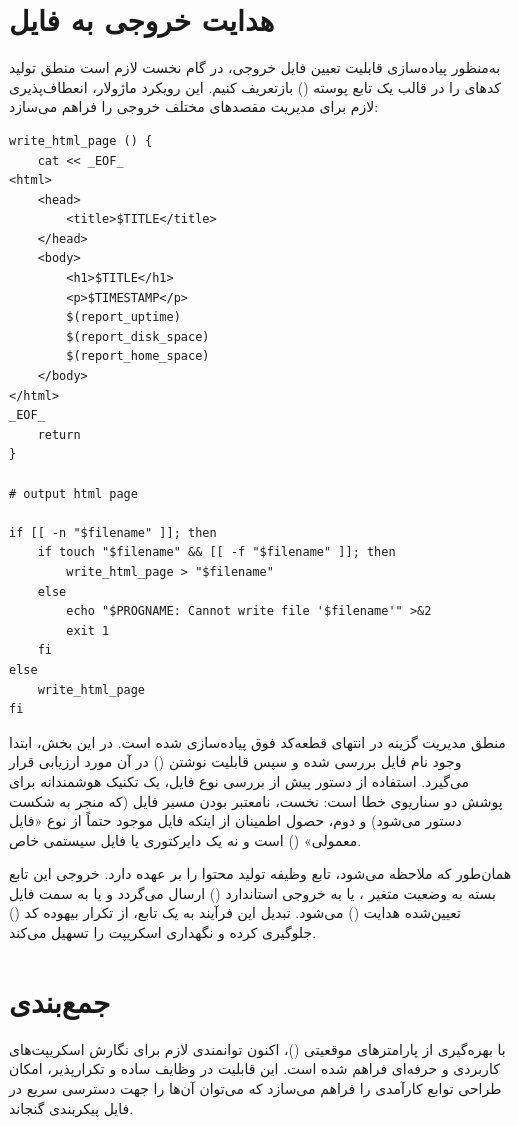 \section{هدایت خروجی به فایل}

به‌منظور پیاده‌سازی قابلیت تعیین فایل خروجی، در گام نخست لازم است منطق تولید کدهای  را در قالب یک تابع پوسته () بازتعریف کنیم. این رویکرد ماژولار، انعطاف‌پذیری لازم برای مدیریت مقصدهای مختلف خروجی را فراهم می‌سازد:

\begin{latin}
\begin{lstlisting}
write_html_page () {
    cat << _EOF_
<html>
    <head>
        <title>$TITLE</title>
    </head>
    <body>
        <h1>$TITLE</h1>
        <p>$TIMESTAMP</p>
        $(report_uptime)
        $(report_disk_space)
        $(report_home_space)
    </body>
</html>
_EOF_
    return
}

# output html page

if [[ -n "$filename" ]]; then
    if touch "$filename" && [[ -f "$filename" ]]; then
        write_html_page > "$filename"
    else
        echo "$PROGNAME: Cannot write file '$filename'" >&2
        exit 1
    fi
else
    write_html_page
fi
\end{lstlisting}
\end{latin}

منطق مدیریت گزینه  در انتهای قطعه‌کد فوق پیاده‌سازی شده است. در این بخش، ابتدا وجود نام فایل بررسی شده و سپس قابلیت نوشتن () در آن مورد ارزیابی قرار می‌گیرد. استفاده از دستور  پیش از بررسی نوع فایل، یک تکنیک هوشمندانه برای پوشش دو سناریوی خطا است: نخست، نامعتبر بودن مسیر فایل (که منجر به شکست دستور  می‌شود) و دوم، حصول اطمینان از اینکه فایل موجود حتماً از نوع «فایل معمولی» () است و نه یک دایرکتوری یا فایل سیستمی خاص.

همان‌طور که ملاحظه می‌شود، تابع  وظیفه تولید محتوا را بر عهده دارد. خروجی این تابع بسته به وضعیت متغیر ، یا به خروجی استاندارد () ارسال می‌گردد و یا به سمت فایل تعیین‌شده هدایت () می‌شود. تبدیل این فرآیند به یک تابع، از تکرار بیهوده کد () جلوگیری کرده و نگهداری اسکریپت را تسهیل می‌کند.

\section{جمع‌بندی}

با بهره‌گیری از پارامترهای موقعیتی ()، اکنون توانمندی لازم برای نگارش اسکریپت‌های کاربردی و حرفه‌ای فراهم شده است. این قابلیت در وظایف ساده و تکرارپذیر، امکان طراحی توابع کارآمدی را فراهم می‌سازد که می‌توان آن‌ها را جهت دسترسی سریع در فایل پیکربندی  گنجاند.

